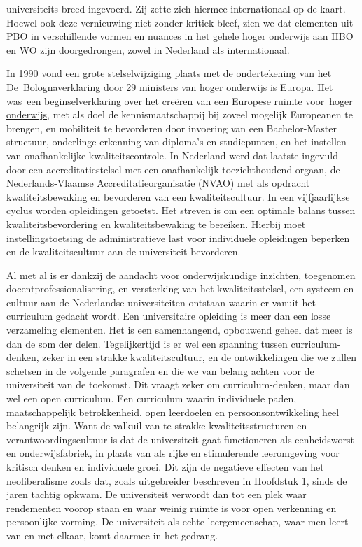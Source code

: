 \documentclass[smallauthor, chapterhaspagenum, nochapterinheader, pagenuminheader,  bigchapnum,medium2, tocpages,  garamond, titleinheader]{jote-book}
\begin{document}
universiteits-breed ingevoerd. Zij zette zich hiermee internationaal op de kaart. Hoewel ook deze vernieuwing niet zonder kritiek bleef, zien we dat elementen uit PBO in verschillende vormen en nuances in het gehele hoger onderwijs aan HBO en WO zijn doorgedrongen, zowel in Nederland als internationaal.



	In 1990 vond een grote stelselwijziging plaats met de ondertekening van het De Bolognaverklaring door 29 ministers van hoger onderwijs is Europa. Het was een beginselverklaring over het creëren van een Europese ruimte voor \href{https://nl.wikipedia.org/wiki/Hoger_onderwijs}{hoger onderwijs}, met als doel de kennismaatschappij bij zoveel mogelijk Europeanen te brengen, en mobiliteit te bevorderen door invoering van een Bachelor-Master structuur, onderlinge erkenning van diploma's en studiepunten, en het instellen van onafhankelijke kwaliteitscontrole. In Nederland werd dat laatste ingevuld door een accreditatiestelsel met een onafhankelijk toezichthoudend orgaan, de Nederlands-Vlaamse Accreditatieorganisatie (NVAO) met als opdracht kwaliteitsbewaking en bevorderen van een kwaliteitscultuur. In een vijfjaarlijkse cyclus worden opleidingen getoetst. Het streven is om een optimale balans tussen kwaliteitsbevordering en kwaliteitsbewaking te bereiken. Hierbij moet instellingstoetsing de administratieve last voor individuele opleidingen beperken en de kwaliteitscultuur aan de universiteit bevorderen.



	Al met al is er dankzij de aandacht voor onderwijskundige inzichten, toegenomen docentprofessionalisering, en versterking van het kwaliteitsstelsel, een systeem en cultuur aan de Nederlandse universiteiten ontstaan waarin er vanuit het curriculum gedacht wordt. Een universitaire opleiding is meer dan een losse verzameling elementen. Het is een samenhangend, opbouwend geheel dat meer is dan de som der delen. Tegelijkertijd is er wel een spanning tussen curriculum-denken, zeker in een strakke kwaliteitscultuur, en de ontwikkelingen die we zullen schetsen in de volgende paragrafen en die we van belang achten voor de universiteit van de toekomst. Dit vraagt zeker om curriculum-denken, maar dan wel een open curriculum. Een curriculum waarin individuele paden, maatschappelijk betrokkenheid, open leerdoelen en persoonsontwikkeling heel belangrijk zijn. Want de valkuil van te strakke kwaliteitsstructuren en verantwoordingscultuur is dat de universiteit gaat functioneren als eenheidsworst en onderwijsfabriek, in plaats van als rijke en stimulerende leeromgeving voor kritisch denken en individuele groei. Dit zijn de negatieve effecten van het neoliberalisme zoals dat, zoals uitgebreider beschreven in Hoofdstuk 1, sinds de jaren tachtig opkwam. De universiteit verwordt dan tot een plek waar rendementen voorop staan en waar weinig ruimte is voor open verkenning en persoonlijke vorming. De universiteit als echte leergemeenschap, waar men leert van en met elkaar, komt daarmee in het gedrang.
\end{document}
